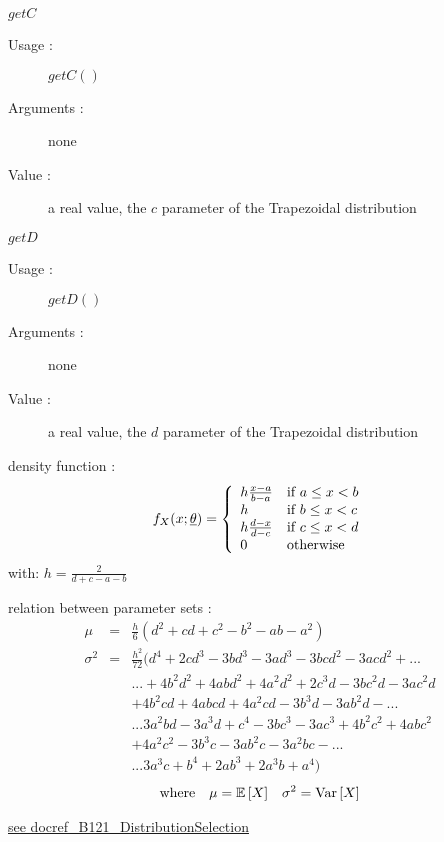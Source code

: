 \begin{description}
\begin{description}
  \item $getC$
    \begin{description}
    \item[Usage :] $getC()$
    \item[Arguments :] none
    \item[Value :]  a real value,  the $c$ parameter of the Trapezoidal distribution
    \end{description}

  \item $getD$
    \begin{description}
    \item[Usage :] $getD()$
    \item[Arguments :] none
    \item[Value :]  a real value,  the $d$ parameter of the Trapezoidal distribution
    \end{description}

  \end{description}

\item[Details :]  \rule{0pt}{1em}
  \begin{description}
  \item density function :
    $$
    f_X(x;{\underline{\theta}}) = \left\{
      \begin{array}{ll}
        h \frac {x-a}{b-a} & \textrm{if}\ a\leq x < b \\
        h & \textrm{if}\ b\leq x < c \\
        h \frac{d-x}{d-c}& \textrm{if}\ c\leq x < d \\
        0 & \textrm{otherwise}
      \end{array}
    \right.
    $$
    with:
    $h=\frac{2}{d+c-a-b}$

  \item relation between parameter sets :
    \begin{eqnarray*}
      \mu           &   = &   \frac{h}{6}(d^2 + cd + c^2 - b^2 - ab - a^2)  \\
      \sigma^2        &  =  &  \frac{h^2}{72}(d^4 + 2cd^3 - 3bd^3 - 3ad^3 - 3bcd^2 - 3acd^2 + ...\\
         & & ... + 4b^2d^2 + 4abd^2 + 4a^2d^2 + 2c^3d - 3bc^2d - 3ac^2d   \\
      & & + 4b^2cd + 4abcd + 4a^2cd - 3b^3d - 3ab^2d - ...\\
         & & ... 3a^2bd - 3a^3d + c^4 - 3bc^3 - 3ac^3 +4b^2c^2 + 4abc^2   \\
      & & + 4a^2c^2 - 3b^3c - 3ab^2c - 3a^2bc - ...\\
         & & ... 3a^3c + b^4 + 2ab^3 + 2a^3b + a^4)
    \end{eqnarray*}
    \begin{align*}
      \mbox{where}
      &&
      \mu = {\mathbb E}\left[ X \right]
      &&
      \sigma^2 = {\rm Var}\left[ X \right]
    \end{align*}
  \end{description}
  \bigskip

\item[Links :]  \rule{0pt}{1em}
  \href{./Version/docref_B121_DistributionSelection.pdf}{see docref\_B121\_DistributionSelection}
\end{description}


